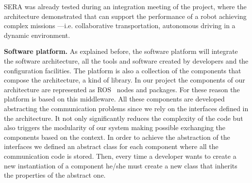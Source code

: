 SERA was already tested during an integration meeting of the project, where the architecture demonstrated that can support the performance of a robot achieving complex missions ---i.e. collaborative transportation, autonomous driving in a dynamic environment.


\textbf{Software platform.}
As explained before, the software platform will integrate the software architecture, all the tools and software created by developers and the configuration facilities.
The platform is also a collection of the components that compose the architecture, a kind of library.
In our project the components of our architecture are represented as ROS~\cite{Quigley2009} nodes and packages.
For these reason the platform is based on this middleware.
All these components are developed abstracting the communication problems since we rely on the interfaces defined in the architecture.
It not only significantly reduces the complexity of the code but also triggers the modularity of our system making possible exchanging the components based on the context.
In order to achieve the abstraction of the interfaces we defined an abstract class for each component where all the communication code is stored.
Then, every time a developer wants to create a new instantiation of a component he/she must create a new class  that inherits the properties of the abstract one.


